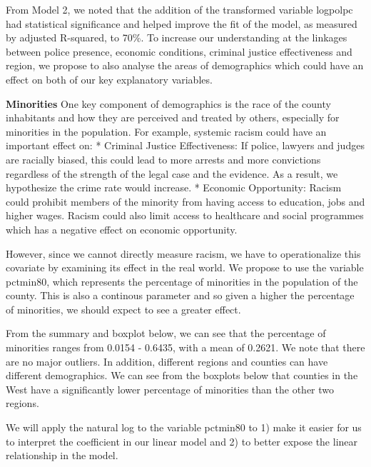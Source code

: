 \documentclass[]{article}
\newenvironment{Shaded}{}{}
\newcommand{\KeywordTok}[1]{\textcolor[rgb]{0.00,0.00,1.00}{#1}}
\newcommand{\NormalTok}[1]{#1}
\newcommand{\OperatorTok}[1]{#1}
\begin{document}
From Model 2, we noted that the addition of the transformed variable
logpolpc had statistical significance and helped improve the fit of the
model, as measured by adjusted R-squared, to 70\%. To increase our
understanding at the linkages between police presence, economic
conditions, criminal justice effectiveness and region, we propose to
also analyse the areas of demographics which could have an effect on
both of our key explanatory variables.

\textbf{Minorities} One key component of demographics is the race of the
county inhabitants and how they are perceived and treated by others,
especially for minorities in the population. For example, systemic
racism could have an important effect on: * Criminal Justice
Effectiveness: If police, lawyers and judges are racially biased, this
could lead to more arrests and more convictions regardless of the
strength of the legal case and the evidence. As a result, we hypothesize
the crime rate would increase. * Economic Opportunity: Racism could
prohibit members of the minority from having access to education, jobs
and higher wages. Racism could also limit access to healthcare and
social programmes which has a negative effect on economic opportunity.

However, since we cannot directly measure racism, we have to
operationalize this covariate by examining its effect in the real world.
We propose to use the variable pctmin80, which represents the percentage
of minorities in the population of the county. This is also a continous
parameter and so given a higher the percentage of minorities, we should
expect to see a greater effect.

From the summary and boxplot below, we can see that the percentage of
minorities ranges from 0.0154 - 0.6435, with a mean of 0.2621. We note
that there are no major outliers. In addition, different regions and
counties can have different demographics. We can see from the boxplots
below that counties in the West have a significantly lower percentage of
minorities than the other two regions.

We will apply the natural log to the variable pctmin80 to 1) make it
easier for us to interpret the coefficient in our linear model and 2) to
better expose the linear relationship in the model.

\begin{Shaded}
\end{Shaded}
\end{document}
